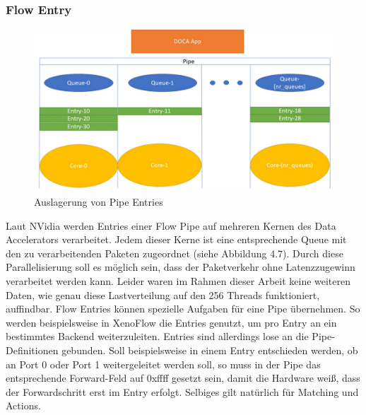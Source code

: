 \subsubsection{Flow Entry}
\begin{figure}
    \centering
    \includegraphics[width=1\linewidth]{images/entries.png}
    \caption{Auslagerung von Pipe Entries}
    \label{fig:enter-label}
\end{figure}
Laut NVidia werden Entries einer Flow Pipe auf mehreren Kernen des Data Accelerators verarbeitet. Jedem dieser Kerne ist eine entsprechende Queue mit den zu verarbeitenden Paketen zugeordnet  (siehe Abbildung 4.7). Durch diese Parallelisierung soll es möglich sein, dass der Paketverkehr ohne Latenzzugewinn verarbeitet werden kann. Leider waren im Rahmen dieser Arbeit keine weiteren Daten, wie genau diese Lastverteilung auf den 256 Threads funktioniert, auffindbar. Flow Entries können spezielle Aufgaben für eine Pipe übernehmen. So werden beispielsweise in XenoFlow die Entries genutzt, um pro Entry an ein bestimmtes Backend weiterzuleiten. Entries sind allerdings lose an die Pipe-Definitionen gebunden. Soll beispielsweise in einem Entry entschieden werden, ob an Port 0 oder Port 1 weitergeleitet werden soll, so muss in der Pipe das entsprechende Forward-Feld auf 0xffff gesetzt sein, damit die Hardware weiß, dass der Forwardschritt erst im Entry erfolgt. Selbiges gilt natürlich für Matching und Actions.
